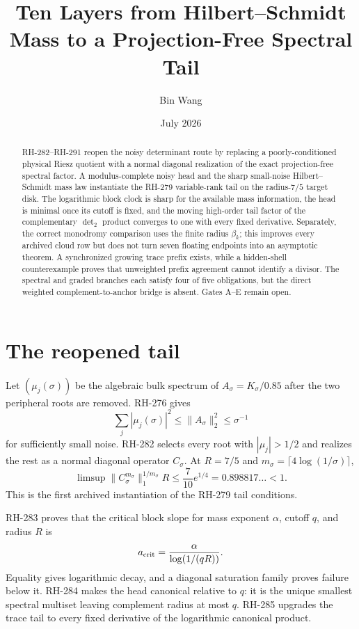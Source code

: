 \documentclass[11pt]{article}
\title{Ten Layers from Hilbert--Schmidt Mass to a Projection-Free Spectral Tail}
\author{Bin Wang}\date{July 2026}
\theoremstyle{remark}\newtheorem{remark}[proposition]{Remark}
\begin{document}
\maketitle
\begin{abstract}
RH-282--RH-291 reopen the noisy determinant route by replacing a
poorly-conditioned physical Riesz quotient with a normal diagonal realization
of the exact projection-free spectral factor.  A modulus-complete noisy head
and the sharp small-noise Hilbert--Schmidt mass law instantiate the RH-279
variable-rank tail on the radius-$7/5$ target disk.  The logarithmic block
clock is sharp for the available mass information, the head is minimal once
its cutoff is fixed, and the moving high-order tail factor of the
complementary $\det_2$ product converges to one with every fixed derivative.
Separately, the correct monodromy comparison uses the finite radius
$\beta_k$; this improves every archived cloud row but does not turn seven
floating endpoints into an asymptotic theorem.  A synchronized growing trace
prefix exists, while a hidden-shell counterexample proves that unweighted
prefix agreement cannot identify a divisor.  The spectral and graded
branches each satisfy four of five obligations, but the direct weighted
complement-to-anchor bridge is absent.  Gates A--E remain open.
\end{abstract}

\section{The reopened tail}
Let $(\mu_j(\sigma))$ be the algebraic bulk spectrum of
$A_\sigma=K_\sigma/0.85$ after the two peripheral roots are removed.  RH-276
gives
\[
 \sum_j|\mu_j(\sigma)|^2\le\|A_\sigma\|_2^2\le\sigma^{-1}
\]
for sufficiently small noise.  RH-282 selects every root with
$|\mu_j|>1/2$ and realizes the rest as a normal diagonal operator
$C_\sigma$.  At $R=7/5$ and
$m_\sigma=\lceil4\log(1/\sigma)\rceil$,
\[
 \limsup\|C_\sigma^{m_\sigma}\|_1^{1/m_\sigma}R
 \le\frac7{10}e^{1/4}=0.898817\ldots<1.
\]
This is the first archived instantiation of the RH-279 tail conditions.

RH-283 proves that the critical block slope for mass exponent $\alpha$,
cutoff $q$, and radius $R$ is
\[
 a_{\rm crit}=\frac{\alpha}{\log(1/(qR))}.
\]
Equality gives logarithmic decay, and a diagonal saturation family proves
failure below it.  RH-284 makes the head canonical relative to $q$: it is the
unique smallest spectral multiset leaving complement radius at most $q$.
RH-285 upgrades the trace tail to every fixed derivative of the logarithmic
canonical product.
\end{document}
